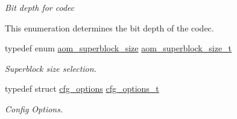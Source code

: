 \begin{DoxyCompactItemize}
\begin{DoxyCompactList}\small\item\em Bit depth for codec
\begin{DoxyItemize}
\item This enumeration determines the bit depth of the codec. 
\end{DoxyItemize}\end{DoxyCompactList}\item 
typedef enum \hyperlink{group__codec_gac34a24f7c6c0fef7518aed0da4425f61}{aom\+\_\+superblock\+\_\+size} \hyperlink{group__codec_ga8d0bf39eb86f047f1b2f6f1efe05a3ae}{aom\+\_\+superblock\+\_\+size\+\_\+t}
\begin{DoxyCompactList}\small\item\em Superblock size selection. \end{DoxyCompactList}\item 
typedef struct \hyperlink{structcfg__options}{cfg\+\_\+options} \hyperlink{group__codec_ga58cddec4492c70945a2b4c3773c665b0}{cfg\+\_\+options\+\_\+t}
\begin{DoxyCompactList}\small\item\em Config Options. \end{DoxyCompactList}\end{DoxyCompactItemize}
